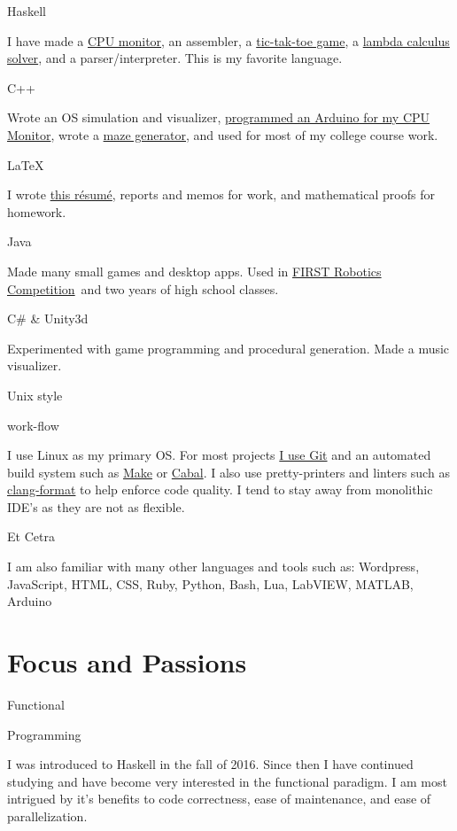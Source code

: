 \documentclass{article}
\newcommand{\jskill}[2]{
\noindent
\begin{minipage}[t]{.15\textwidth}
\hfill #1
\end{minipage}
\hspace{.05em}\vline\hspace{.05em}
\begin{minipage}[t]{.80\textwidth}
#2
\end{minipage}

\vspace{0.75em}}
\newcommand{\frc}{\href{https://www.firstinspires.org/robotics/frc}{FIRST Robotics Competition}}
\begin{document}
\jskill{Haskell}{I have made a \href{https://github.com/joshuatshaffer/retro-cpu-monitor/tree/master/host-haskell}{CPU monitor}, an assembler, a \href{https://github.com/joshuatshaffer/tic-tac-lambda}{tic-tak-toe game}, a \href{https://github.com/joshuatshaffer/de-bruijn-index}{lambda calculus solver}, and a parser/interpreter. This is my favorite language.}

\jskill{C++}{Wrote an OS simulation and visualizer, \href{https://github.com/joshuatshaffer/retro-cpu-monitor/tree/master/arduino/retro_cpu_monitor_sketch}{programmed an Arduino for my CPU Monitor}, wrote a \href{https://github.com/joshuatshaffer/Command-Line-Maze}{maze generator}, and used for most of my college course work.}

\jskill{\LaTeX}{I wrote \href{https://github.com/joshuatshaffer/resume}{this r\'esum\'e}, reports and memos for work, and mathematical proofs for homework.}

\jskill{Java}{Made many small games and desktop apps. Used in \frc\ and two years of high school classes.}

\jskill{C\# \& Unity3d}{Experimented with game programming and procedural generation. Made a music visualizer.}

\jskill{Unix style 

\hfill work-flow}{I use Linux as my primary OS. For most projects \href{https://github/joshuatshaffer}{I use Git} and an automated build system such as \href{https://en.wikipedia.org/wiki/Make_(software)}{Make} or \href{https://www.haskell.org/cabal/}{Cabal}. I also use pretty-printers and linters such as \href{http://clang.llvm.org/docs/ClangFormat.html}{clang-format} to help enforce code quality. I tend to stay away from monolithic IDE's as they are not as flexible.}

\jskill{Et Cetra}{I am also familiar with many other languages and tools such as: Wordpress, JavaScript, HTML, CSS, Ruby, Python, Bash, Lua, LabVIEW, MATLAB, Arduino}

\section{Focus and Passions}

\jskill{Functional 

\hfill Programming} {I was introduced to Haskell in the fall of 2016. Since then I have continued studying and have become very interested in the functional paradigm. I am most intrigued by it's benefits to code correctness, ease of maintenance, and ease of parallelization.}
\end{document}
